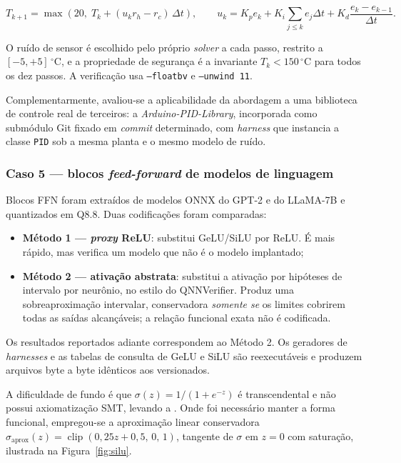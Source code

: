 \begin{equation}
T_{k+1} = \max\!\left(20,\; T_k + (u_k r_h - r_c)\,\Delta t\right), \qquad
u_k = K_p e_k + K_i \sum_{j \le k} e_j \Delta t + K_d \frac{e_k - e_{k-1}}{\Delta t}.
\end{equation}

O ruído de sensor é escolhido pelo próprio \textit{solver} a cada passo, restrito a
$[-5,+5]\,^\circ$C, e a propriedade de segurança é a invariante $T_k < 150\,^\circ$C para
todos os dez passos. A verificação usa \texttt{--floatbv} e \texttt{--unwind 11}.

Complementarmente, avaliou-se a aplicabilidade da abordagem a uma biblioteca de controle real
de terceiros: a \textit{Arduino-PID-Library}, incorporada como submódulo Git fixado em
\textit{commit} determinado, com \textit{harness} que instancia a classe \texttt{PID} sob a
mesma planta e o mesmo modelo de ruído.

\subsubsection{Caso 5 --- blocos \textit{feed-forward} de modelos de linguagem}

Blocos FFN foram extraídos de modelos ONNX do GPT-2 e do LLaMA-7B e quantizados em Q8.8. Duas
codificações foram comparadas:

\begin{itemize}[leftmargin=1.4cm]
  \item \textbf{Método 1 --- \textit{proxy} ReLU}: substitui GeLU/SiLU por ReLU. É mais
  rápido, mas verifica um modelo que não é o modelo implantado;
  \item \textbf{Método 2 --- ativação abstrata}: substitui a ativação por hipóteses de
  intervalo por neurônio, no estilo do QNNVerifier. Produz uma sobreaproximação intervalar,
  conservadora \emph{somente se} os limites cobrirem todas as saídas alcançáveis; a relação
  funcional exata não é codificada.
\end{itemize}

Os resultados reportados adiante correspondem ao Método 2. Os geradores de
\textit{harnesses} e as tabelas de consulta de GeLU e SiLU são reexecutáveis e produzem
arquivos byte a byte idênticos aos versionados.

A dificuldade de fundo é que $\sigma(z) = 1/(1+e^{-z})$ é transcendental e não possui
axiomatização SMT, levando a . Onde foi necessário manter a forma
funcional, empregou-se a aproximação linear conservadora
$\sigma_{\text{aprox}}(z) = \operatorname{clip}(0{,}25z + 0{,}5,\,0,\,1)$, tangente de
$\sigma$ em $z = 0$ com saturação, ilustrada na Figura~\ref{fig:silu}.

